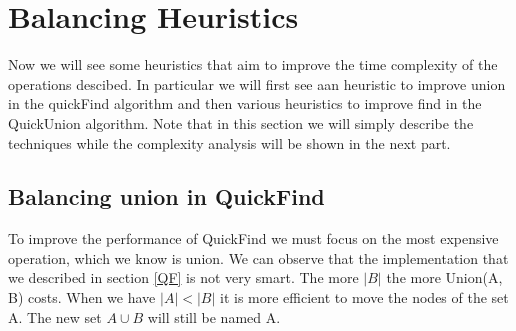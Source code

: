 \documentclass{article}
\begin{document}
\section{Balancing Heuristics}
Now we will see some heuristics that aim to improve the time complexity of the operations descibed. In particular
we will first see aan heuristic to improve union in the quickFind algorithm and then various heuristics to improve
find in the QuickUnion algorithm. Note that in this section we will simply describe the techniques while the 
complexity analysis will be shown in the next part.
\subsection{Balancing union in QuickFind}
To improve the performance of QuickFind we must focus on the most expensive operation, which we know is 
union. We can observe that the implementation that we described in section \ref{QF} is not very smart. The more $ | B | $ the more
Union(A, B) costs. When we have $|A| < |B| $ it is more efficient to move the nodes of the set A. The new set
$A \cup B$ will still be named A.
\end{document}
